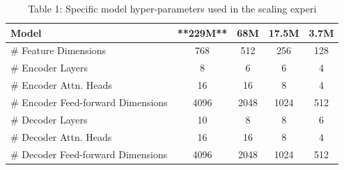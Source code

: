 \begin{table}[t]
\centering
\caption{Table 1: Specific model hyper-parameters used in the scaling experi}
\label{tab:2410.03494}
\begin{tabular}{lcccc}
\toprule
Model & **229M** & 68M & 17.5M & 3.7M \\
\midrule
# Feature Dimensions & 768 & 512 & 256 & 128 \\
# Encoder Layers & 8 & 6 & 6 & 4 \\
# Encoder Attn. Heads & 16 & 16 & 8 & 4 \\
# Encoder Feed-forward Dimensions & 4096 & 2048 & 1024 & 512 \\
# Decoder Layers & 10 & 8 & 8 & 6 \\
# Decoder Attn. Heads & 16 & 16 & 8 & 4 \\
# Decoder Feed-forward Dimensions & 4096 & 2048 & 1024 & 512 \\
\bottomrule
\end{tabular}
\end{table}

